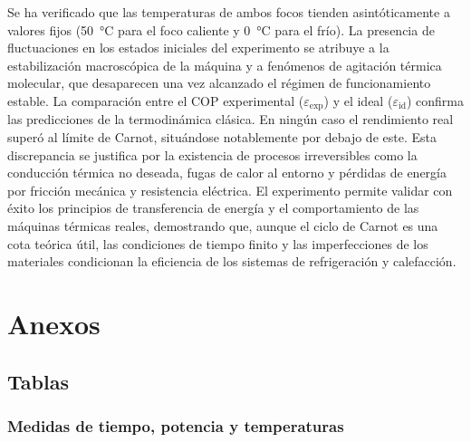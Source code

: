 \documentclass[a4paper,11pt]{article}
\begin{document}
Se ha verificado que las temperaturas de ambos focos tienden asintóticamente a valores fijos (\SI{50}{\degreeCelsius} para el foco caliente y \SI{0}{\degreeCelsius} para el frío). La presencia de fluctuaciones en los estados iniciales del experimento se atribuye a la estabilización macroscópica de la máquina y a fenómenos de agitación térmica molecular, que desaparecen una vez alcanzado el régimen de funcionamiento estable.    
La comparación entre el COP experimental ($\varepsilon_{\mathrm{exp}}$) y el ideal ($\varepsilon_{\mathrm{id}}$) confirma las predicciones de la termodinámica clásica. En ningún caso el rendimiento real superó al límite de Carnot, situándose notablemente por debajo de este. Esta discrepancia se justifica por la existencia de procesos irreversibles como la conducción térmica no deseada, fugas de calor al entorno y pérdidas de energía por fricción mecánica y resistencia eléctrica.    
El experimento permite validar con éxito los principios de transferencia de energía y el comportamiento de las máquinas térmicas reales, demostrando que, aunque el ciclo de Carnot es una cota teórica útil, las condiciones de tiempo finito y las imperfecciones de los materiales condicionan la eficiencia de los sistemas de refrigeración y calefacción.

\section{Anexos}
\subsection{Tablas}

\subsubsection{Medidas de tiempo, potencia y temperaturas}
\end{document}
